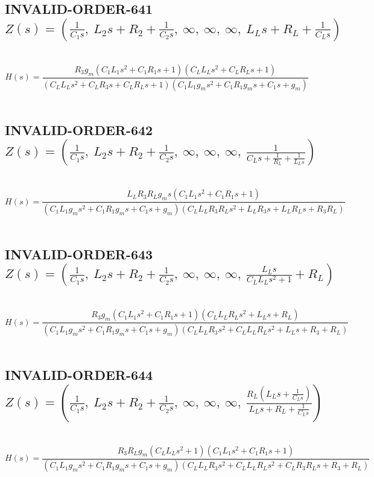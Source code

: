 \documentclass{article}
\begin{document}
\subsection{INVALID-ORDER-641 $Z(s) = \left( \frac{1}{C_{1} s}, \  L_{2} s + R_{2} + \frac{1}{C_{2} s}, \  \infty, \  \infty, \  \infty, \  L_{L} s + R_{L} + \frac{1}{C_{L} s}\right)$ } \ 
\textbf{\[H(s) = \frac{R_{3} g_{m} \left(C_{1} L_{1} s^{2} + C_{1} R_{1} s + 1\right) \left(C_{L} L_{L} s^{2} + C_{L} R_{L} s + 1\right)}{\left(C_{L} L_{L} s^{2} + C_{L} R_{3} s + C_{L} R_{L} s + 1\right) \left(C_{1} L_{1} g_{m} s^{2} + C_{1} R_{1} g_{m} s + C_{1} s + g_{m}\right)}\] } \ 
\subsection{INVALID-ORDER-642 $Z(s) = \left( \frac{1}{C_{1} s}, \  L_{2} s + R_{2} + \frac{1}{C_{2} s}, \  \infty, \  \infty, \  \infty, \  \frac{1}{C_{L} s + \frac{1}{R_{L}} + \frac{1}{L_{L} s}}\right)$ } \ 
\textbf{\[H(s) = \frac{L_{L} R_{3} R_{L} g_{m} s \left(C_{1} L_{1} s^{2} + C_{1} R_{1} s + 1\right)}{\left(C_{1} L_{1} g_{m} s^{2} + C_{1} R_{1} g_{m} s + C_{1} s + g_{m}\right) \left(C_{L} L_{L} R_{3} R_{L} s^{2} + L_{L} R_{3} s + L_{L} R_{L} s + R_{3} R_{L}\right)}\] } \ 
\subsection{INVALID-ORDER-643 $Z(s) = \left( \frac{1}{C_{1} s}, \  L_{2} s + R_{2} + \frac{1}{C_{2} s}, \  \infty, \  \infty, \  \infty, \  \frac{L_{L} s}{C_{L} L_{L} s^{2} + 1} + R_{L}\right)$ } \ 
\textbf{\[H(s) = \frac{R_{3} g_{m} \left(C_{1} L_{1} s^{2} + C_{1} R_{1} s + 1\right) \left(C_{L} L_{L} R_{L} s^{2} + L_{L} s + R_{L}\right)}{\left(C_{1} L_{1} g_{m} s^{2} + C_{1} R_{1} g_{m} s + C_{1} s + g_{m}\right) \left(C_{L} L_{L} R_{3} s^{2} + C_{L} L_{L} R_{L} s^{2} + L_{L} s + R_{3} + R_{L}\right)}\] } \ 
\subsection{INVALID-ORDER-644 $Z(s) = \left( \frac{1}{C_{1} s}, \  L_{2} s + R_{2} + \frac{1}{C_{2} s}, \  \infty, \  \infty, \  \infty, \  \frac{R_{L} \left(L_{L} s + \frac{1}{C_{L} s}\right)}{L_{L} s + R_{L} + \frac{1}{C_{L} s}}\right)$ } \ 
\textbf{\[H(s) = \frac{R_{3} R_{L} g_{m} \left(C_{L} L_{L} s^{2} + 1\right) \left(C_{1} L_{1} s^{2} + C_{1} R_{1} s + 1\right)}{\left(C_{1} L_{1} g_{m} s^{2} + C_{1} R_{1} g_{m} s + C_{1} s + g_{m}\right) \left(C_{L} L_{L} R_{3} s^{2} + C_{L} L_{L} R_{L} s^{2} + C_{L} R_{3} R_{L} s + R_{3} + R_{L}\right)}\] } \ 
\end{document}
